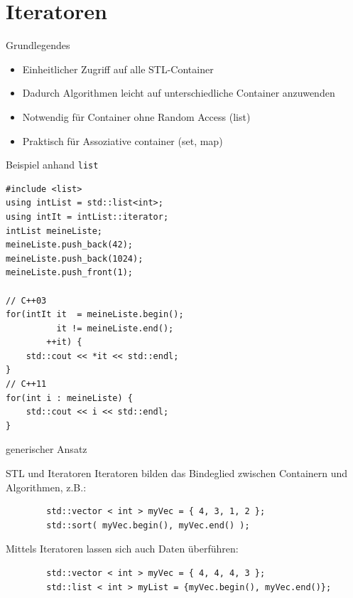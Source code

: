 \section{Iteratoren}

\begin{frame}[fragile]{Grundlegendes}
	\begin{itemize}
		\item Einheitlicher Zugriff auf alle STL-Container
		\item Dadurch Algorithmen leicht auf unterschiedliche Container anzuwenden
		\item Notwendig für Container ohne Random Access (list)
		\item Praktisch für Assoziative container (set, map)
	\end{itemize}
\end{frame}

\begin{frame}[fragile]{Beispiel anhand \texttt{list}}
	\begin{lstlisting}[]
#include <list>
using intList = std::list<int>;
using intIt = intList::iterator;
intList meineListe;
meineListe.push_back(42);
meineListe.push_back(1024);
meineListe.push_front(1);

// C++03
for(intIt it  = meineListe.begin();
          it != meineListe.end();
        ++it) {
    std::cout << *it << std::endl;
}
// C++11
for(int i : meineListe) {
    std::cout << i << std::endl;
}
	\end{lstlisting}
\end{frame}

\begin{frame}[t]{generischer Ansatz}
	\onslide*<+> {  }
	\onslide<+-> {  }
\end{frame}

\begin{frame}{STL und Iteratoren}
	Iteratoren bilden das Bindeglied zwischen Containern und Algorithmen, z.B.:
	\begin{lstlisting}
		std::vector < int > myVec = { 4, 3, 1, 2 };
		std::sort( myVec.begin(), myVec.end() );
	\end{lstlisting}
	
	\pause
	Mittels Iteratoren lassen sich auch Daten überführen:
	
	\begin{lstlisting}
		std::vector < int > myVec = { 4, 4, 4, 3 };
		std::list < int > myList = {myVec.begin(), myVec.end()};
	\end{lstlisting}
\end{frame}

